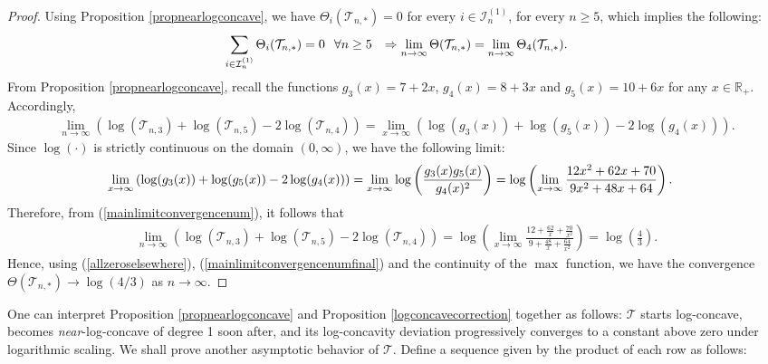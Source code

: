 \documentclass[a4paper,12pt]{article}
\def\R{\mathbb{R}}
\def\T{\mathcal{T}}
\begin{document}
\begin{proof}
Using Proposition \ref{propnearlogconcave}, we have $\Theta_{i}\left( \T_{n,*} \right) = 0$ for every $i \in \mathcal{I}_{n}^{(1)}$, for every $n\geq 5$, which implies the following:
\begin{align}
\sum_{i \in \mathcal{I}_{n}^{(1)}} \Theta_{i}( \T_{n,*} ) = 0 \hspace{0.1in} \text{$\forall n\geq 5$} \hspace{0.1in} \Rightarrow \lim_{n \rightarrow \infty}\Theta(\T_{n,*}) = \lim_{n \rightarrow \infty} \Theta_{4}(\T_{n,*}). \label{allzeroselsewhere}
\end{align}
From Proposition \ref{propnearlogconcave}, recall the functions $g_3(x) = 7 + 2x$, $g_4(x) = 8 + 3x$  and $g_5(x) = 10 + 6x$ for any $x\in\R_+$. Accordingly,
\begin{align}
\lim_{n \rightarrow \infty} \left(\log(\T_{n,3}) + \log(\T_{n,5}) - 2\log(\T_{n,4})\right) = \lim_{x \rightarrow \infty} \left(\log(g_3(x)) + \log(g_5(x)) - 2\log(g_4(x))\right). \label{mainlimitconvergencenum}
\end{align}
Since $\log(\cdot)$ is strictly continuous on the domain $(0, \infty)$, we have the following limit:
\begin{align*}
\lim_{x \rightarrow \infty} \left(\log(g_3(x)) + \log(g_5(x)) - 2\log(g_4(x))\right) &= \lim_{x \rightarrow \infty} \log \left( \frac{g_3(x)g_5(x)}{g_4(x)^2} \right) = \log \left( \lim_{x \rightarrow \infty} \frac{12x^2 + 62x + 70}{9x^2 + 48x + 64} \right). \notag
\end{align*}
Therefore, from (\ref{mainlimitconvergencenum}), it follows that
\begin{align}
\lim_{n \rightarrow \infty} \left(\log(\T_{n,3}) + \log(\T_{n,5}) - 2\log(\T_{n,4})\right) = \log \left( \lim_{x \rightarrow \infty} \frac{12 + \frac{62}{x} + \frac{70}{x^2}}{9 + \frac{48}{x} + \frac{64}{x^2}} \right) = \log \left( \frac{4}{3} \right). \label{mainlimitconvergencenumfinal}
\end{align}
Hence, using (\ref{allzeroselsewhere}), (\ref{mainlimitconvergencenumfinal}) and the continuity of the $\max$ function, we have the convergence $\Theta(\T_{n,*}) \rightarrow \log(4/3)$ as $n \rightarrow \infty$.
\end{proof}
One can interpret Proposition \ref{propnearlogconcave} and Proposition \ref{logconcavecorrection} together as follows: $\T$ starts log-concave, becomes \emph{near}-log-concave of degree 1 soon after, and its log-concavity deviation progressively converges to a constant above zero under logarithmic scaling. We shall prove another asymptotic behavior of $\T$. Define a sequence given by the product of each row as follows: 
\end{document}

